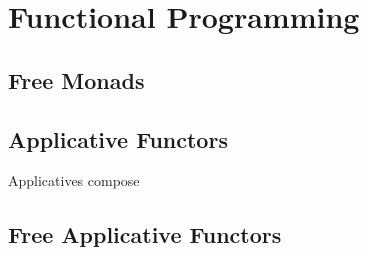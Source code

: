 \section{Functional Programming}
\label{sec:funct-progr}

\subsection{Free Monads}
\label{sec:free-monads}

\cite{Haxl}

\subsection{Applicative Functors}
\label{sec:applicative-functors}

Applicatives compose \cite{EssenceIterator}

\subsection{Free Applicative Functors}
\label{sec:free-appl-funct}

\cite{FreeApplicatives}

